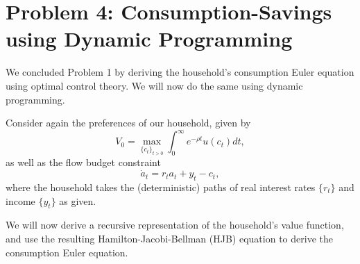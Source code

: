 \documentclass[11pt]{extarticle}
\theoremstyle{plain}
\theoremstyle{definition}
\begin{document}
\section*{Problem 4: Consumption-Savings using Dynamic Programming}

We concluded Problem 1 by deriving the household's consumption Euler equation using optimal control theory. We will now do the same using dynamic programming.


Consider again the preferences of our household, given by
\begin{equation*}
	V_0 = \max_{\{c_t\}_{t>0}} \int_0^\infty e^{-\rho t} u(c_t) dt,
\end{equation*}
as well as the flow budget constraint
\begin{equation*}
	\dot a_t = r_t a_t + y_t - c_t,
\end{equation*}
where the household takes the (deterministic) paths of real interest rates $\{r_t\}$ and income $\{y_t\}$ as given.


We will now derive a recursive representation of the household's value function, and use the resulting Hamilton-Jacobi-Bellman (HJB) equation to derive the consumption Euler equation.
\end{document}
